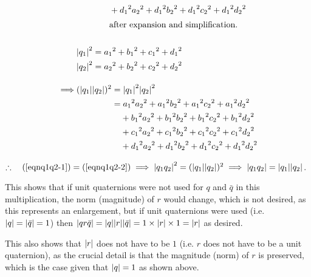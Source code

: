 \documentclass[12pt]{article}
\theoremstyle{definition}
\begin{document}
\begin{alignat}{2}
             & \phantom{\abs{q_1q_2}^2=} + {d_1}^2{a_2}^2 + {d_1}^2{b_2}^2 + {d_1}^2{c_2}^2 + {d_1}^2{d_2}^2 \nonumber \\
             & \phantom{\abs{q_1q_2}^2=} \text{after expansion and simplification.} \\[15pt]
    & \abs{q_1}^2 = {a_1}^2 + {b_1}^2 + {c_1}^2 + {d_1}^2 \\
    & \abs{q_2}^2 = {a_2}^2 + {b_2}^2 + {c_2}^2 + {d_2}^2 \nonumber \\[10pt]
    \implies & (\abs{q_1}\abs{q_2})^2 = \abs{q_1}^2\abs{q_2}^2 \nonumber \\
             & \phantom{(\abs{q_1}\abs{q_2})^2} = {a_1}^2{a_2}^2 + {a_1}^2{b_2}^2 + {a_1}^2{c_2}^2 + {a_1}^2{d_2}^2 \label{eqnq1q2-2} \\
             & \phantom{(\abs{q_1}\abs{q_2})^2=} + {b_1}^2{a_2}^2 + {b_1}^2{b_2}^2 + {b_1}^2{c_2}^2 + {b_1}^2{d_2}^2 \nonumber \\
             & \phantom{(\abs{q_1}\abs{q_2})^2=} + {c_1}^2{a_2}^2 + {c_1}^2{b_2}^2 + {c_1}^2{c_2}^2 + {c_1}^2{d_2}^2 \nonumber \\
             & \phantom{(\abs{q_1}\abs{q_2})^2=} + {d_1}^2{a_2}^2 + {d_1}^2{b_2}^2 + {d_1}^2{c_2}^2 + {d_1}^2{d_2}^2 \nonumber
\end{alignat}

$\therefore \quad (\ref{eqnq1q2-1}) = (\ref{eqnq1q2-2}) \implies \abs{q_1q_2}^2 = (\abs{q_1}\abs{q_2})^2 \implies \abs{q_1q_2} = \abs{q_1}\abs{q_2}$.

This shows that if unit quaternions were not used for $q$ and $\bar{q}$ in this multiplication, the norm (magnitude) of $r$ would change, which is not desired, as this represents an enlargement, but if unit quaternions were used (i.e. $\abs{q} = \abs{\bar{q}} = 1$) then $\abs{qr\bar{q}} = \abs{q}\abs{r}\abs{\bar{q}} = 1\times\abs{r}\times1 = \abs{r}$ as desired.

This also shows that $\abs{r}$ does not have to be $1$ (i.e. $r$ does not have to be a unit quaternion), as the crucial detail is that the magnitude (norm) of $r$ is preserved, which is the case given that $\abs{q} = 1$ as shown above.

\pagebreak

\printbibliography
\end{document}
